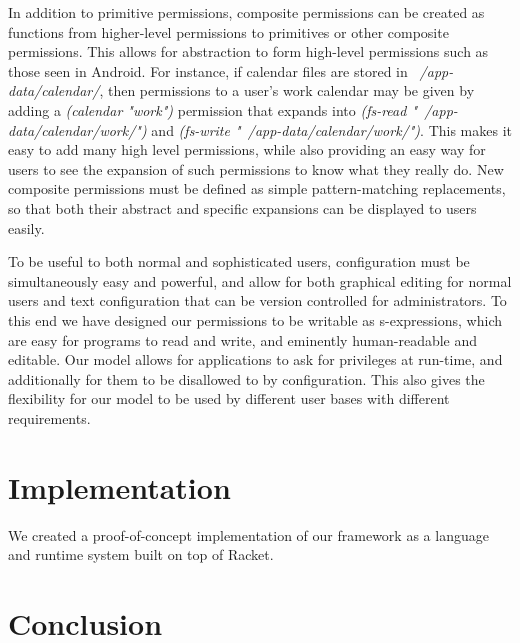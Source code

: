 In addition to primitive permissions, composite permissions can be created as functions from higher-level permissions to primitives or other composite permissions.  This allows for abstraction to form high-level permissions such as those seen in Android.  For instance, if calendar files are stored in \textit{~/app-data/calendar/}, then permissions to a user's work calendar may be given by adding a \textit{(calendar "work")} permission that expands into \textit{(fs-read "~/app-data/calendar/work/")} and \textit{(fs-write "~/app-data/calendar/work/")}.  This makes it easy to add many high level permissions, while also providing an easy way for users to see the expansion of such permissions to know what they really do.  New composite permissions must be defined as simple pattern-matching replacements, so that both their abstract and specific expansions can be displayed to users easily.

To be useful to both normal and sophisticated users, configuration must be simultaneously easy and powerful, and allow for both graphical editing for normal users and text configuration that can be version controlled for administrators.  
To this end we have designed our permissions to be writable as s-expressions, which are easy for programs to read and write, and eminently human-readable and editable.
Our model allows for applications to ask for privileges at run-time, and additionally for them to be disallowed to by configuration.  This also gives the flexibility for our model to be used by different user bases with different requirements.


\section{Implementation}\label{section:implementation}
We created a proof-of-concept implementation of our framework as a language and runtime system built on top of Racket\cite{racket}.

\section{Conclusion}\label{section:conclusion}

